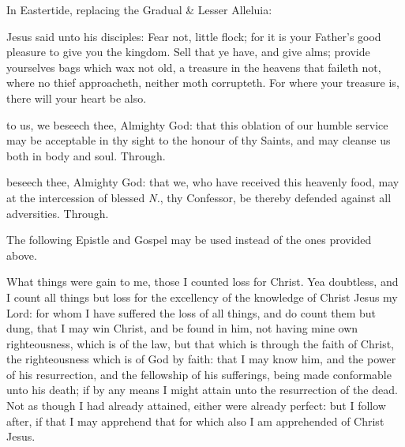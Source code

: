 \begin{rubric}
{In Eastertide, replacing the Gradual \& Lesser Alleluia:}
\end{rubric}

\vspace{-1ex}


\label{CommonConfessorNotBishopIIGospel}
 Jesus said unto his disciples: Fear not, little flock; for it is your Father's good pleasure to give you the kingdom. Sell that ye have, and give alms; provide yourselves bags which wax not old, a treasure in the heavens that faileth not, where no thief approacheth, neither moth corrupteth. For where your treasure is, there will your heart be also.


\secret
{} to us, we beseech thee, Almighty God: that this oblation of our humble service may be acceptable in thy sight to the honour of thy Saints, and may cleanse us both in body and soul. Through.


\postcommunion
{} beseech thee, Almighty God: that we, who have received this heavenly food, may at the intercession of blessed \textit{N.}, thy Confessor, be thereby defended against all adversities. Through.

\begin{rubric}
	The following Epistle and Gospel may be used instead of the ones provided above.
\end{rubric}
\label{Philippians37}
 What things were gain to me, those I counted loss for Christ. Yea doubtless, and I count all things but loss for the excellency of the knowledge of Christ Jesus my Lord: for whom I have suffered the loss of all things, and do count them but dung, that I may win Christ, and be found in him, not having mine own righteousness, which is of the law, but that which is through the faith of Christ, the righteousness which is of God by faith: that I may know him, and the power of his resurrection, and the fellowship of his sufferings, being made conformable unto his death; if by any means I might attain unto the resurrection of the dead. Not as though I had already attained, either were already perfect: but I follow after, if that I may apprehend that for which also I am apprehended of Christ Jesus.

